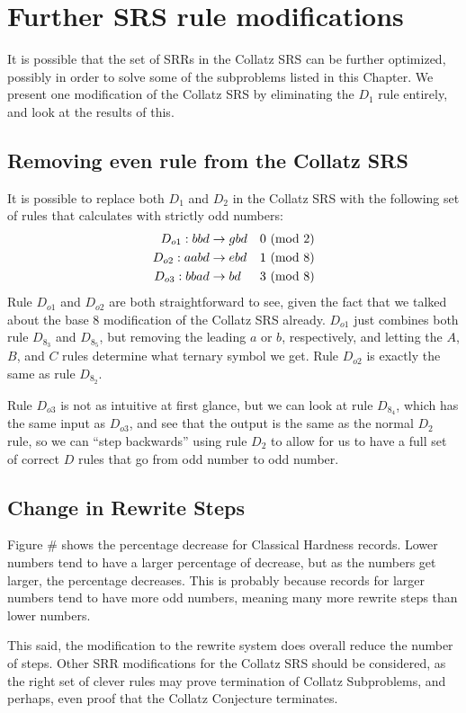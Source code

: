 \section{Further SRS rule modifications}\label{subsec:srsrulemod}
It is possible that the set of SRRs in the Collatz SRS can be further optimized, possibly in order to solve some of the subproblems listed in this Chapter. We present one modification of the Collatz SRS by eliminating the $D_1$ rule entirely, and look at the results of this.
\subsection{Removing even rule from the Collatz SRS}\label{subsubsec:evenruleremove}
It is possible to replace both $D_1$ and $D_2$ in the Collatz SRS with the following set of rules that calculates with strictly odd numbers:
\begin{align*}
    D_{o1}: bbd &\rightarrow gbd &\text{$0\ (\mathrm{mod}\ 2)$}\\
    D_{o2}: aabd &\rightarrow ebd &\text{$1\ (\mathrm{mod}\ 8)$}\\
    D_{o3}: bbad &\rightarrow bd &\text{$3\ (\mathrm{mod}\ 8)$}
\end{align*}
Rule $D_{o1}$ and $D_{o2}$ are both straightforward to see, given the fact that we talked about the base 8 modification of the Collatz SRS already. $D_{o1}$ just combines both rule $D_{8_3}$ and $D_{8_5}$, but removing the leading $a$ or $b$, respectively, and letting the $A$, $B$, and $C$ rules determine what ternary symbol we get. Rule $D_{o2}$ is exactly the same as rule $D_{8_2}$.\par
Rule $D_{o3}$ is not as intuitive at first glance, but we can look at rule $D_{8_4}$, which has the same input as $D_{o3}$, and see that the output is the same as the normal $D_2$ rule, so we can ``step backwards'' using rule $D_2$ to allow for us to have a full set of correct $D$ rules that go from odd number to odd number.
\subsection{Change in Rewrite Steps}
Figure \# shows the percentage decrease for Classical Hardness records. Lower numbers tend to have a larger percentage of decrease, but as the numbers get larger, the percentage decreases. This is probably because records for larger numbers tend to have more odd numbers, meaning many more rewrite steps than lower numbers. \par
This said, the modification to the rewrite system does overall reduce the number of steps. Other SRR modifications for the Collatz SRS should be considered, as the right set of clever rules may prove termination of Collatz Subproblems, and perhaps, even proof that the Collatz Conjecture terminates.
